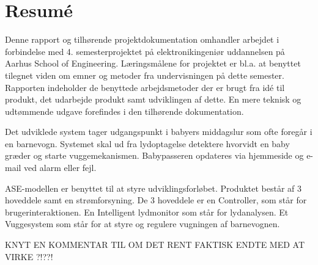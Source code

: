 \chapter{Resumé}

Denne rapport og tilhørende projektdokumentation omhandler arbejdet i forbindelse med 4. semesterprojektet på elektronikingeniør uddannelsen på Aarhus School of Engineering. Læringsmålene for projektet er bl.a. at benyttet tilegnet viden om emner og metoder fra undervisningen på dette semester. Rapporten indeholder de benyttede arbejdsmetoder der er brugt fra idé til produkt, det udarbejde produkt samt udviklingen af dette. En mere teknisk og udtømmende udgave forefindes i den tilhørende dokumentation. 

Det udviklede system tager udgangspunkt i babyers middagslur som ofte foregår i en barnevogn. Systemet skal ud fra lydoptagelse detektere hvorvidt en baby græder og starte vuggemekanismen. Babypasseren opdateres via hjemmeside og e-mail ved alarm eller fejl.

ASE-modellen er benyttet til at styre udviklingsforløbet. Produktet består af 3 hoveddele samt en strømforsyning. De 3 hoveddele er en Controller, som står for brugerinteraktionen. En Intelligent lydmonitor som står for lydanalysen. Et Vuggesystem som står for at styre og regulere vugningen af barnevognen. 


KNYT EN KOMMENTAR TIL OM DET RENT FAKTISK ENDTE MED AT VIRKE ?!??!